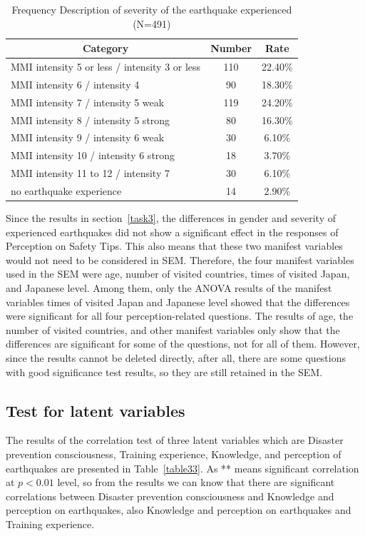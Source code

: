 \begin{table}[h]
  \caption[Frequency Description of severity of the earthquake experienced]{Frequency Description of severity of the earthquake experienced (N=491)}
  \label{table28g}
  \centering
  \begin{tabular}{l|cc}
 \hline
\multicolumn{1}{c|}{Category}&Number&Rate\\
 \hline
MMI intensity 5 or less / intensity 3 or less & 110 & 22.40\% \\
MMI intensity 6 / intensity 4                 & 90  & 18.30\% \\
MMI intensity 7 / intensity 5 weak            & 119 & 24.20\% \\
MMI intensity 8 / intensity 5 strong          & 80  & 16.30\% \\
MMI intensity 9 / intensity 6 weak            & 30  & 6.10\%  \\
MMI intensity 10 / intensity 6 strong                                 & 18  & 3.70\%  \\
MMI intensity 11 to 12 / intensity 7                                  & 30  & 6.10\%  \\
no earthquake experience                                              & 14  & 2.90\%  \\
 \hline
  \end{tabular}
\end{table}


Since the results in section~\ref{task3}, the differences in gender and severity of experienced earthquakes did not show a significant effect in the responses of Perception on Safety Tips. This also means that these two manifest variables would not need to be considered in SEM. Therefore, the four manifest variables used in the SEM were age, number of visited countries, times of visited Japan, and Japanese level. Among them, only the ANOVA results of the manifest variables times of visited Japan and Japanese level showed that the differences were significant for all four perception-related questions. The results of age, the number of visited countries, and other manifest variables only show that the differences are significant for some of the questions, not for all of them. However, since the results cannot be deleted directly, after all, there are some questions with good significance test results, so they are still retained in the SEM.

\subsection{Test for latent variables }
The results of the correlation test of three latent variables which are Disaster prevention consciousness, Training experience, Knowledge, and perception of earthquakes are presented in Table~\ref{table33}. As ** means significant correlation at $p<0.01$ level, so from the results we can know that there are significant correlations between Disaster prevention consciousness and Knowledge and perception on earthquakes, also Knowledge and perception on earthquakes and Training experience.

